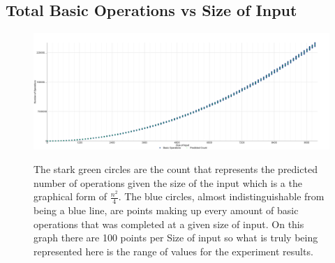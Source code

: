 \documentclass[12pt]{article}
\begin{document}
\begin{appendices}
\section{Total Basic Operations vs Size of Input}
\begin{figure}[h]
	\centering
	\includegraphics[scale=.15]{TotalOperationsVsHypothAmount}\\[.1cm]
	\caption{\label{total-basic-operations-v-size-of-input} The stark green circles are the count that represents the predicted number of operations given the size of the input which is a the graphical form of $\frac{n^2}{4}$. The blue circles, almost indistinguishable from being a blue line, are points making up every amount of basic operations that was completed at a given size of input. On this graph there are 100 points per Size of input so what is truly being represented here is the range of values for the experiment results.}
\end{figure}

\newpage

\end{appendices}
\end{document}
